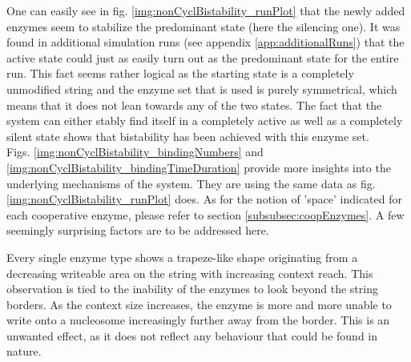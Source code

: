            One can easily see in fig. \ref{img:nonCyclBistability_runPlot} that the newly added enzymes seem to stabilize the predominant state (here the silencing one). It was found in additional simulation runs (see appendix \ref{app:additionalRuns}) that the active state could just as easily turn out as the predominant state for the entire run. This fact seems rather logical as the starting state is a completely unmodified string and the enzyme set that is used is purely symmetrical, which means that it does not lean towards any of the two states. The fact that the system can either stably find itself in a completely active as well as a completely silent state shows that bistability has been achieved with this enzyme set.\\

            Figs. \ref{img:nonCyclBistability_bindingNumbers} and \ref{img:nonCyclBistability_bindingTimeDuration} provide more insights into the underlying mechanisms of the system. They are using the same data as fig. \ref{img:nonCyclBistability_runPlot} does. As for the notion of 'space' indicated for each cooperative enzyme, please refer to section \ref{subsubsec:coopEnzymes}. A few seemingly surprising factors are to be addressed here.

            Every single enzyme type shows a trapeze-like shape originating from a decreasing writeable area on the string with increasing context reach. This observation is tied to the inability of the enzymes to look beyond the string borders. As the context size increases, the enzyme is more and more unable to write onto a nucleosome  increasingly further away from the border. This is an unwanted effect, as it does not reflect any behaviour that could be found in nature.

